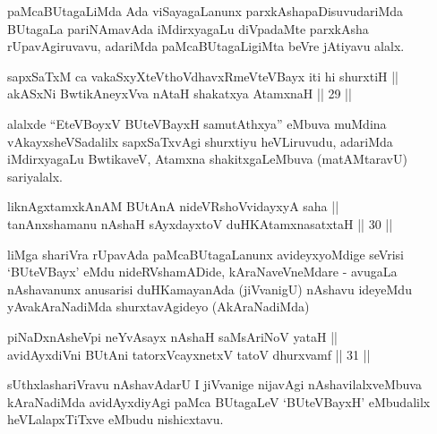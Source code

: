 \begin{artha}
paMcaBUtagaLiMda Ada viSayagaLanunx
parxkAshapaDisuvudariMda BUtagaLa pariNAmavAda iMdirxyagaLu diVpadaMte
parxkAsha rUpavAgiruvavu, adariMda paMcaBUtagaLigiMta beVre jAtiyavu alalx.
\end{artha}


\begin{shl}
sapxSaTxM ca vakaSxyXteV\s thoVdhavxRmeVteVBayx iti hi shurxtiH || \\
akASxNi BwtikAneyxVva nAtaH shakatxya AtamxnaH \hfill || 29 ||
  
\end{shl}

\begin{artha}
alalxde ``EteVBoyxV BUteVBayxH samutAthxya'' eMbuva muMdina vAkayxsheVSadalilx sapxSaTxvAgi
shurxtiyu heVLiruvudu, adariMda iMdirxyagaLu BwtikaveV,
Atamxna shakitxgaLeMbuva (matAMtaravU) sariyalalx.
\end{artha}


\begin{shl}
liknAgxtamxkAnAM BUtAnA nideVRshoV\s vidayxyA saha || \\
tanAnxshamanu nAshaH sAyxdayxtoV duHKAtamxnasatxtaH \hfill || 30 ||
  
\end{shl}

\begin{artha}
liMga shariVra rUpavAda paMcaBUtagaLanunx avideyxyoMdige seVrisi
`BUteVBayx' eMdu nideRVshamADide, kAraNaveVneMdare - avugaLa
nAshavanunx anusarisi duHKamayanAda (jiVvanigU) nAshavu ideyeMdu
yAvakAraNadiMda shurxtavAgideyo (AkAraNadiMda)
\end{artha}


\begin{shl}
piNaDxnAsheV\s pi neYvAsayx nAshaH saMsAriNoV yataH || \\
\footnotemark[1]avidAyxdiVni BUtAni tatorxVcayxnetxV tatoV dhurxvamf \hfill || 31 ||
  
\end{shl}

\begin{artha}
sUthxlashariVravu nAshavAdarU I jiVvanige nijavAgi
nAshavilalxveMbuva kAraNadiMda avidAyxdiyAgi paMca BUtagaLeV
`BUteVBayxH' eMbudalilx heVLalapxTiTxve eMbudu nishicxtavu.
\end{artha}
